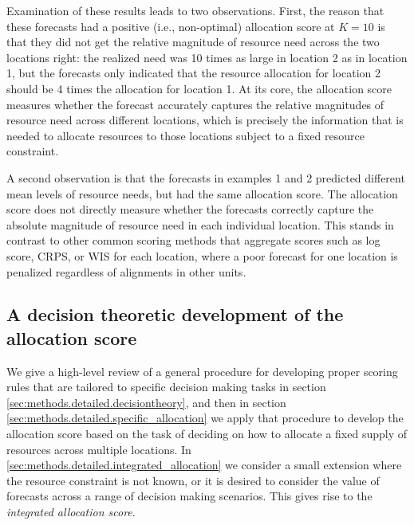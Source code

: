 \documentclass{article}\usepackage[]{graphicx}\usepackage[]{xcolor}
\begin{document}
Examination of these results leads to two observations. First, the reason that these forecasts had a positive (i.e., non-optimal) allocation score at $K=10$ is that they did not get the relative magnitude of resource need across the two locations right: the realized need was 10 times as large in location 2 as in location 1, but the forecasts only indicated that the resource allocation for location 2 should be 4 times the allocation for location 1.
At its core, the allocation score measures whether the forecast accurately captures the relative magnitudes of resource need across different locations, which is precisely the information that is needed to allocate resources to those locations subject to a fixed resource constraint.

A second observation is that the forecasts in examples 1 and 2 predicted different mean levels of resource needs, but had the same allocation score.
The allocation score does not directly measure whether the forecasts correctly capture the absolute magnitude of resource need in each individual location.
This stands in contrast to other common scoring methods that aggregate scores such as log score, CRPS, or WIS for each location, where a poor forecast for one location is penalized regardless of alignments in other units.

\subsection{A decision theoretic development of the allocation score}
\label{sec:methods.detailed}

We give a high-level review of a general procedure for developing proper scoring rules that are tailored to specific decision making tasks in section \ref{sec:methods.detailed.decisiontheory}, and then in section \ref{sec:methods.detailed.specific_allocation} we apply that procedure to develop the allocation score based on the task of deciding on how to allocate a fixed supply of resources across multiple locations. In \ref{sec:methods.detailed.integrated_allocation} we consider a small extension where the resource constraint is not known, or it is desired to consider the value of forecasts across a range of decision making scenarios. This gives rise to the \emph{integrated allocation score}.
\end{document}
